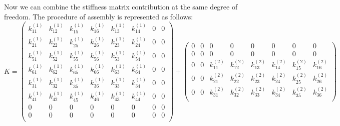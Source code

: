 Now we can combine the stiffness matrix contribution at the same degree of freedom.  The procedure of assembly is represented as follows:
\begin{equation*}
K = \begin{pmatrix}
k_{11}^{\left(1\right)} & k_{12}^{\left(1\right)} &  k_{15}^{\left(1\right)} &  k_{16}^{\left(1\right)} & k_{13}^{\left(1\right)}  & k_{14}^{\left(1\right)} & 0 & 0   \\[0.3em]
k_{21}^{\left(1\right)} & k_{22}^{\left(1\right)} &  k_{25}^{\left(1\right)} &  k_{26}^{\left(1\right)} & k_{23}^{\left(1\right)}  & k_{24}^{\left(1\right)} & 0 & 0   \\[0.3em]
k_{51}^{\left(1\right)} & k_{52}^{\left(1\right)} &  k_{55}^{\left(1\right)} &  k_{56}^{\left(1\right)} & k_{53}^{\left(1\right)}  & k_{54}^{\left(1\right)} & 0 & 0   \\[0.3em]
k_{61}^{\left(1\right)} & k_{62}^{\left(1\right)} &  k_{65}^{\left(1\right)} &  k_{66}^{\left(1\right)} & k_{63}^{\left(1\right)}  & k_{64}^{\left(1\right)}  & 0 & 0  \\[0.3em]
k_{31}^{\left(1\right)} & k_{32}^{\left(1\right)} &  k_{35}^{\left(1\right)} &  k_{36}^{\left(1\right)} & k_{33}^{\left(1\right)}  & k_{34}^{\left(1\right)}  & 0 & 0  \\[0.3em]
k_{41}^{\left(1\right)} & k_{42}^{\left(1\right)} &  k_{45}^{\left(1\right)} &  k_{46}^{\left(1\right)} & k_{43}^{\left(1\right)}  & k_{44}^{\left(1\right)}  & 0 & 0  \\[0.3em]
0 & 0 & 0 & 0 & 0 & 0 & 0 & 0 \\[0.3em]
0 & 0 & 0 & 0 & 0 & 0 & 0 & 0 \\[0.3em]
\end{pmatrix} + \begin{pmatrix}
0 & 0 & 0 & 0 & 0 & 0 & 0 & 0 \\[0.3em]
0 & 0 & 0 & 0 & 0 & 0 & 0 & 0 \\[0.3em]
0 & 0 &k_{11}^{\left(2\right)} & k_{12}^{\left(2\right)} &  k_{13}^{\left(2\right)} &  k_{14}^{\left(2\right)} & k_{15}^{\left(2\right)}  & k_{16}^{\left(2\right)}   \\[0.3em]
0 & 0 & k_{21}^{\left(2\right)} & k_{22}^{\left(2\right)} &  k_{23}^{\left(2\right)} &  k_{24}^{\left(2\right)} & k_{25}^{\left(2\right)}  & k_{26}^{\left(2\right)}   \\[0.3em]
0 & 0 & k_{31}^{\left(2\right)} & k_{32}^{\left(2\right)} &  k_{33}^{\left(2\right)} &  k_{34}^{\left(2\right)} & k_{35}^{\left(2\right)}  & k_{36}^{\left(2\right)}    \\[0.3em]

\end{pmatrix}
\end{equation*}
